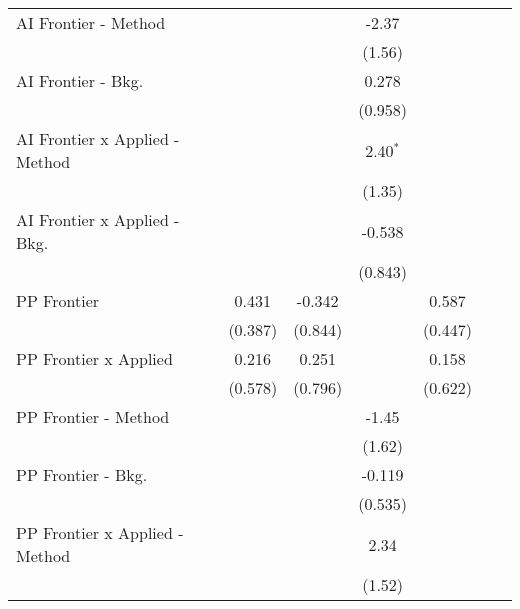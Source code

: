 \begin{tabular}{lcccccc}
   AI Frontier - Method           &          &              & -2.37         &                &        &   \\   
                                  &          &              & (1.56)        &                &        &   \\   
   AI Frontier - Bkg.             &          &              & 0.278         &                &        &   \\   
                                  &          &              & (0.958)       &                &        &   \\   
   AI Frontier x Applied - Method &          &              & 2.40$^{*}$    &                &        &   \\   
                                  &          &              & (1.35)        &                &        &   \\   
   AI Frontier x Applied - Bkg.   &          &              & -0.538        &                &        &   \\   
                                  &          &              & (0.843)       &                &        &   \\   
   PP Frontier                    & 0.431    & -0.342       &               & 0.587          &        &   \\   
                                  & (0.387)  & (0.844)      &               & (0.447)        &        &   \\   
   PP Frontier x Applied          & 0.216    & 0.251        &               & 0.158          &        &   \\   
                                  & (0.578)  & (0.796)      &               & (0.622)        &        &   \\   
   PP Frontier - Method           &          &              & -1.45         &                &        &   \\   
                                  &          &              & (1.62)        &                &        &   \\   
   PP Frontier - Bkg.             &          &              & -0.119        &                &        &   \\   
                                  &          &              & (0.535)       &                &        &   \\   
   PP Frontier x Applied - Method &          &              & 2.34          &                &        &   \\   
                                  &          &              & (1.52)        &                &        &   \\   

\end{tabular}
